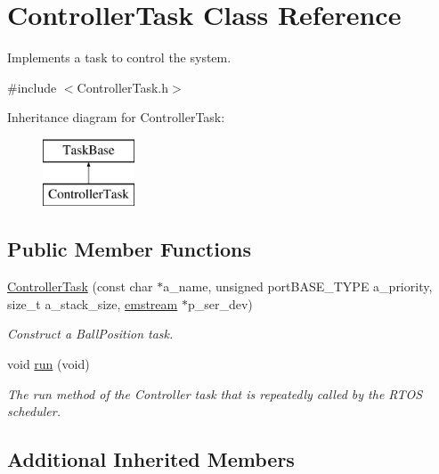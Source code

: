 \hypertarget{class_controller_task}{}\section{Controller\+Task Class Reference}
\label{class_controller_task}


Implements a task to control the system.  




{\ttfamily \#include $<$Controller\+Task.\+h$>$}

Inheritance diagram for Controller\+Task\+:\begin{figure}[H]
\begin{center}
\leavevmode
\includegraphics[height=2.000000cm]{class_controller_task}
\end{center}
\end{figure}
\subsection*{Public Member Functions}
\begin{DoxyCompactItemize}
\item 
\mbox{\hyperlink{class_controller_task_a2b2914fa356737e69e9ec1e3ffd3a8e3}{Controller\+Task}} (const char $\ast$a\+\_\+name, unsigned port\+B\+A\+S\+E\+\_\+\+T\+Y\+PE a\+\_\+priority, size\+\_\+t a\+\_\+stack\+\_\+size, \mbox{\hyperlink{classemstream}{emstream}} $\ast$p\+\_\+ser\+\_\+dev)
\begin{DoxyCompactList}\small\item\em Construct a Ball\+Position task. \end{DoxyCompactList}\item 
void \mbox{\hyperlink{class_controller_task_adb32c437ea51d258b986414ab48c6180}{run}} (void)
\begin{DoxyCompactList}\small\item\em The run method of the Controller task that is repeatedly called by the R\+T\+OS scheduler. \end{DoxyCompactList}\end{DoxyCompactItemize}
\subsection*{Additional Inherited Members}


